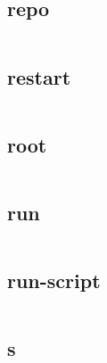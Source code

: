 \subsection{repo}


\begin{lstlisting}[language=bash]

\end{lstlisting}

\subsection{restart}

\begin{lstlisting}[language=bash]

\end{lstlisting}

\subsection{root}


\begin{lstlisting}[language=bash]

\end{lstlisting}

\subsection{run}



\begin{lstlisting}[language=bash]

\end{lstlisting}

\subsection{run-script}


\begin{lstlisting}[language=bash]

\end{lstlisting}

\subsection{s}


\begin{lstlisting}[language=bash]

\end{lstlisting}


